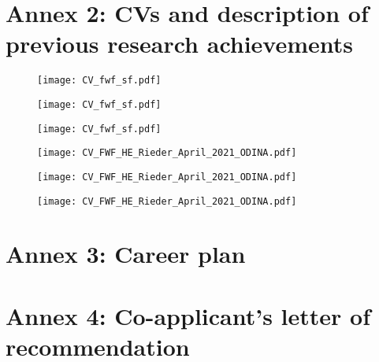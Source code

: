 
\printbibliography[env=bibliography, title=Annex 1: References]

\newpage
\chapter{Annex 2: CVs and description of previous research achievements}
\vspace{-1\baselineskip}
\begin{figure}[!ht]
 \centering 
 \texttt{[image: CV\_fwf\_sf.pdf]}
\end{figure}
\begin{figure}[!ht]
 \centering 
 \texttt{[image: CV\_fwf\_sf.pdf]}
\end{figure}
\begin{figure}[!ht]
 \centering 
 \texttt{[image: CV\_fwf\_sf.pdf]}
\end{figure}
\begin{figure}[!ht]
\centering
\texttt{[image: CV\_FWF\_HE\_Rieder\_April\_2021\_ODINA.pdf]}
\end{figure}
\begin{figure}[!ht]
\centering
\texttt{[image: CV\_FWF\_HE\_Rieder\_April\_2021\_ODINA.pdf]}
\end{figure}
\begin{figure}[!ht]
\centering
\texttt{[image: CV\_FWF\_HE\_Rieder\_April\_2021\_ODINA.pdf]}
\end{figure}

\clearpage
\chapter{Annex 3: Career plan}
\label{appendix:career}



\newpage
\chapter{Annex 4: Co-applicant's letter of recommendation}
\begin{figure}[!ht]
\centering

\end{figure}

